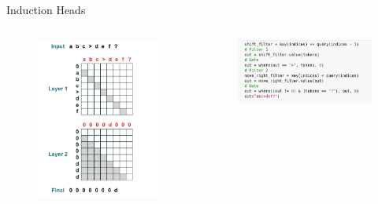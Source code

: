 \documentclass[14pt,aspectratio=169]{beamer}
\begin{document}
\begin{frame}{Induction Heads}

\begin{columns}
    \begin{column}{0.5\textwidth}
    \begin{figure}
        \centering
        \includegraphics[height=0.8\textheight]{Figs/induct.png}
        
        \label{fig:my_label}
    \end{figure}        
    \end{column}    
    \begin{column}{0.5\textwidth}
    \begin{figure}
        \centering

        \includegraphics[height=0.3\textheight]{Figs/RASP.png}
        \label{fig:my_label}
    \end{figure}        
    \end{column}    
\end{columns}

\end{frame}
\end{document}
